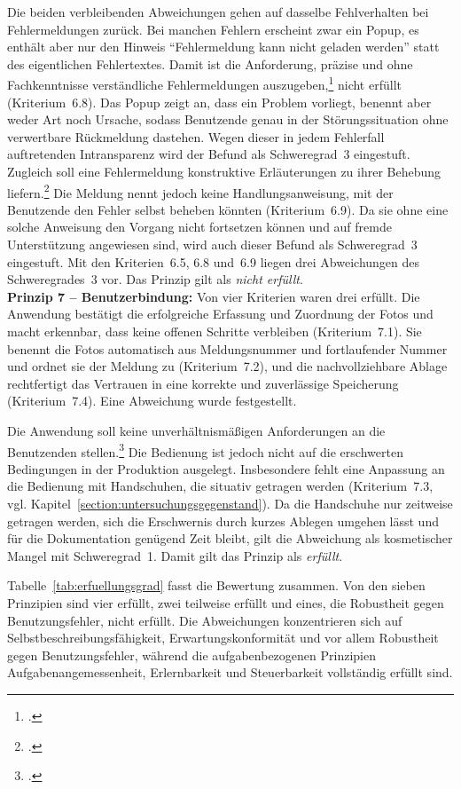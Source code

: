 Die beiden verbleibenden Abweichungen gehen auf dasselbe Fehlverhalten bei
Fehlermeldungen zurück.
Bei manchen Fehlern erscheint zwar ein Popup, es enthält aber nur den Hinweis
\enquote{Fehlermeldung kann nicht geladen werden} statt des eigentlichen
Fehlertextes.
Damit ist die Anforderung, präzise und ohne Fachkenntnisse verständliche
Fehlermeldungen
auszugeben,\footcite[Vgl.][Abschnitt~5.6.4.2]{DIN_ISO_9241-110:2020} nicht erfüllt
(Kriterium~6.8).
Das Popup zeigt an, dass ein Problem vorliegt, benennt aber weder Art noch
Ursache, sodass Benutzende genau in der Störungssituation ohne verwertbare
Rückmeldung dastehen.
Wegen dieser in jedem Fehlerfall auftretenden Intransparenz wird der Befund als
Schweregrad~3 eingestuft.
Zugleich soll eine Fehlermeldung konstruktive Erläuterungen zu ihrer Behebung
liefern.\footcite[Vgl.][Abschnitt~5.6.4.3]{DIN_ISO_9241-110:2020}
Die Meldung nennt jedoch keine Handlungsanweisung, mit der Benutzende den Fehler
selbst beheben könnten (Kriterium~6.9).
Da sie ohne eine solche Anweisung den Vorgang nicht fortsetzen können und auf
fremde Unterstützung angewiesen sind, wird auch dieser Befund als Schweregrad~3
eingestuft.
Mit den Kriterien~6.5, 6.8 und~6.9 liegen drei Abweichungen des Schweregrades~3
vor.
Das Prinzip gilt als \emph{nicht erfüllt}.\\
\textbf{Prinzip 7 -- Benutzerbindung:}
Von vier Kriterien waren drei erfüllt.
Die Anwendung bestätigt die erfolgreiche Erfassung und Zuordnung der Fotos und
macht erkennbar, dass keine offenen Schritte verbleiben (Kriterium~7.1).
Sie benennt die Fotos automatisch aus Meldungsnummer und fortlaufender Nummer und
ordnet sie der Meldung zu (Kriterium~7.2), und die nachvollziehbare Ablage
rechtfertigt das Vertrauen in eine korrekte und zuverlässige Speicherung
(Kriterium~7.4).
Eine Abweichung wurde festgestellt.

Die Anwendung soll keine unverhältnismäßigen Anforderungen an die Benutzenden
stellen.\footcite[Vgl.][Abschnitt~5.7.2.7]{DIN_ISO_9241-110:2020}
Die Bedienung ist jedoch nicht auf die erschwerten Bedingungen in der Produktion
ausgelegt.
Insbesondere fehlt eine Anpassung an die Bedienung mit Handschuhen, die situativ
getragen werden (Kriterium~7.3,
vgl. Kapitel~\ref{section:untersuchungsgegenstand}).
Da die Handschuhe nur zeitweise getragen werden, sich die Erschwernis durch
kurzes Ablegen umgehen lässt und für die Dokumentation genügend Zeit bleibt, gilt
die Abweichung als kosmetischer Mangel mit Schweregrad~1.
Damit gilt das Prinzip als \emph{erfüllt}.

\bigskip
Tabelle~\ref{tab:erfuellungsgrad} fasst die Bewertung zusammen.
Von den sieben Prinzipien sind vier erfüllt, zwei teilweise erfüllt und eines,
die Robustheit gegen Benutzungsfehler, nicht erfüllt.
Die Abweichungen konzentrieren sich auf Selbstbeschreibungsfähigkeit,
Erwartungskonformität und vor allem Robustheit gegen Benutzungsfehler, während
die aufgabenbezogenen Prinzipien Aufgabenangemessenheit, Erlernbarkeit und
Steuerbarkeit vollständig erfüllt sind.

